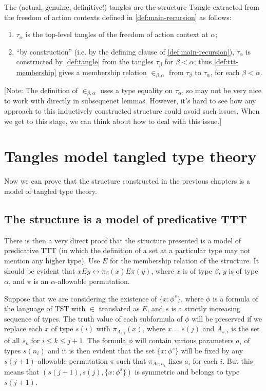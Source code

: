 \newcommand{\Tangle}{\mathrm{Tangle}}
\begin{definition}
  \label{def:tangle-completed}
  The (actual, genuine, definitive!) tangles are the structure $\Tangle$ extracted from the freedom of action contexts defined in \cref{def:main-recursion} as follows:
  \begin{enumerate}
    \item $\tau_\alpha$ is the top-level tangles of the freedom of action context at $\alpha$;
    \item “by construction” (i.e. by the defining clause of \cref{def:main-recursion}), $\tau_\alpha$ is constructed by \cref{def:tangle} from the tangles $\tau_\beta$ for $\beta < \alpha$; thus \cref{def:ttt-membership} gives a membership relation $\in_{\beta,\alpha}$ from $\tau_\beta$ to $\tau_\alpha$, for each $\beta < \alpha$.
  \end{enumerate}

  [Note: The definition of $\in_{\beta,\alpha}$ uses a type equality on $\tau_\alpha$, so may not be very nice to work with directly in subsequenet lemmas.  However, it’s hard to see how any approach to this inductively constructed structure could avoid such issues.  When we get to this stage, we can think about how to deal with this issue.]
\end{definition}

\newpage

\chapter{Tangles model tangled type theory}

Now we can prove that the structure constructed in the previous chapters is a model of tangled type theory.

\section{The structure is a model of predicative TTT}

There is then a very direct proof that the structure presented is a model of predicative TTT (in which the definition of a set at a particular type may not mention any higher type).  Use $E$ for the membership relation of the structure.  It should be evident that $x E y \leftrightarrow \pi_\beta(x) E \pi(y)$,
where $x$ is of type $\beta$, $y$ is of type $\alpha$, and $\pi$ is an $\alpha$-allowable permutation.

Suppose that we are considering the existence of $\{x : \phi^s\}$, where $\phi$ is a formula of the language of TST with $\in$ translated as $E$, and $s$ is a strictly increasing sequence of types.  The truth value of each subformula of $\phi$ will be preserved if we replace each $x$ of type $s(i)$ with $\pi_{A_{s,i}}(x)$, where
$x=s(j)$ and $A_{s,i}$ is the set of all $s_k$ for $i \leq k \leq j+1$.  The formula $\phi$ will contain various parameters $a_i$ of types $s(n_i)$ and it is then evident that the set $\{x : \phi^s\}$ will be fixed by any $s(j+1)$-allowable permutation $\pi$ such that $\pi_{A{s,n_i}}$ fixes $a_i$ for each $i$.  But this means that
$(s(j+1),s(j),\{x : \phi^s\})$ is symmetric and belongs to type $s(j+1)$.

